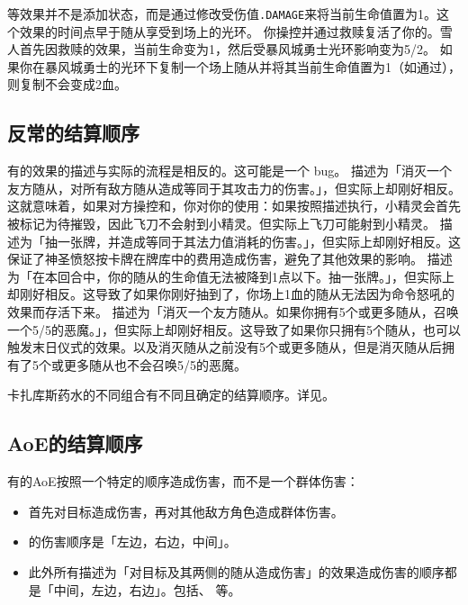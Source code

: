 \notice {}等效果并不是添加状态，而是通过修改受伤值\texttt{.DAMAGE}来将当前生命值置为1。这个效果的时间点早于随从享受到场上的光环。
\example 你操控并通过救赎复活了你的。雪人首先因救赎的效果，当前生命变为1，然后受暴风城勇士光环影响变为5/2。
\notice 如果你在暴风城勇士的光环下复制一个场上随从并将其当前生命值置为1（如通过），则复制不会变成2血。

\subsection{反常的结算顺序}

有的效果的描述与实际的流程是相反的。这可能是一个 bug。
\example {}描述为「消灭一个友方随从，对所有敌方随从造成等同于其攻击力的伤害。」，但实际上却刚好相反。这就意味着，如果对方操控和，你对你的使用：如果按照描述执行，小精灵会首先被标记为待摧毁，因此飞刀不会射到小精灵。但实际上飞刀可能射到小精灵。
\example {}描述为「抽一张牌，并造成等同于其法力值消耗的伤害。」，但实际上却刚好相反。这保证了神圣愤怒按卡牌在牌库中的费用造成伤害，避免了其他效果的影响。
\example {}描述为「在本回合中，你的随从的生命值无法被降到1点以下。抽一张牌。」，但实际上却刚好相反。这导致了如果你刚好抽到了，你场上1血的随从无法因为命令怒吼的效果而存活下来。
\example {}描述为「消灭一个友方随从。如果你拥有5个或更多随从，召唤一个5/5的恶魔。」，但实际上却刚好相反。这导致了如果你只拥有5个随从，也可以触发末日仪式的效果。以及消灭随从之前没有5个或更多随从，但是消灭随从后拥有了5个或更多随从也不会召唤5/5的恶魔。

卡扎库斯药水的不同组合有不同且确定的结算顺序。详见。

\subsection{AoE的结算顺序}

有的AoE按照一个特定的顺序造成伤害，而不是一个群体伤害：
\begin{itemize}
    \item {}首先对目标造成伤害，再对其他敌方角色造成群体伤害。
    \item {}的伤害顺序是「左边，右边，中间」。
    \item 此外所有描述为「对目标及其两侧的随从造成伤害」的效果造成伤害的顺序都是「中间，左边，右边」。包括、 等。
\end{itemize}

